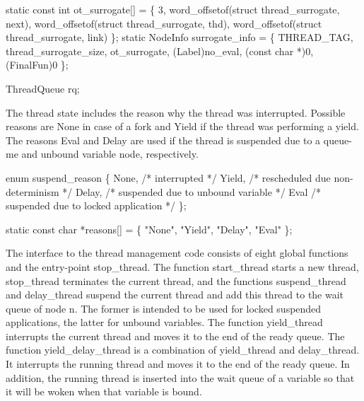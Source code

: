 static const int ot_surrogate[] = \{
    3,
    word_offsetof(struct thread_surrogate, next),
    word_offsetof(struct thread_surrogate, thd),
    word_offsetof(struct thread_surrogate, link)
\};
static NodeInfo surrogate_info = \{
    THREAD_TAG, thread_surrogate_size, ot_surrogate, (Label)no_eval,
    (const char *)0, (FinalFun)0
\};

ThreadQueue rq;

\nwendcode{}\nwdocspar
The thread state includes the reason why the thread was interrupted.
Possible reasons are {\Tt{}None\nwendquote} in case of a fork and {\Tt{}Yield\nwendquote} if the
thread was performing a yield. The reasons {\Tt{}Eval\nwendquote} and {\Tt{}Delay\nwendquote} are
used if the thread is suspended due to a queue-me and unbound variable
node, respectively.

\nwenddocs{}\plusendmoddef\nwstartdeflinemarkup{}\nwenddeflinemarkup
enum suspend_reason \{
    None,                       /* interrupted */
    Yield,                      /* rescheduled due non-determinism */
    Delay,                      /* suspended due to unbound variable */
    Eval                        /* suspended due to locked application */
\};

\nwendcode{}\nwdocspar
\nwenddocs{}\plusendmoddef\nwstartdeflinemarkup{}\nwenddeflinemarkup
static const char   *reasons[] = \{ "None", "Yield", "Delay", "Eval" \};

\nwendcode{}\nwdocspar
The interface to the thread management code consists of eight global
functions and the entry-point {\Tt{}stop{\_}thread\nwendquote}. The function
{\Tt{}start{\_}thread\nwendquote} starts a new thread, {\Tt{}stop{\_}thread\nwendquote} terminates the
current thread, and the functions {\Tt{}suspend{\_}thread\nwendquote} and
{\Tt{}delay{\_}thread\nwendquote} suspend the current thread and add this thread to the
wait queue of node {\Tt{}n\nwendquote}. The former is intended to be used for locked
suspended applications, the latter for unbound variables. The function
{\Tt{}yield{\_}thread\nwendquote} interrupts the current thread and moves it to the end
of the ready queue. The function {\Tt{}yield{\_}delay{\_}thread\nwendquote} is a
combination of {\Tt{}yield{\_}thread\nwendquote} and {\Tt{}delay{\_}thread\nwendquote}. It interrupts
the running thread and moves it to the end of the ready queue. In
addition, the running thread is inserted into the wait queue of a
variable so that it will be woken when that variable is bound.

